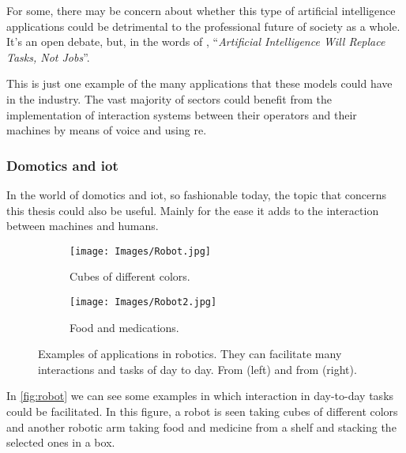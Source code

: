 \begin{remarkBox}
  For some, there may be concern about whether this type of artificial
  intelligence applications could be detrimental to the professional future of
  society as a whole. It's an open debate, but, in the words of
  \citeauthor*{contributor18:artif_intel_will_replac_tasks_not_jobs}
  \cite{contributor18:artif_intel_will_replac_tasks_not_jobs},
  ``\textit{Artificial Intelligence Will Replace Tasks, Not Jobs}''.
\end{remarkBox}

This is just one example of the many applications that these models could have
in the industry. The vast majority of sectors could benefit from the
implementation of interaction systems between their operators and their
machines by means of voice and using \gls{re}.

\subsubsection{Domotics and \acs*{iot}}

In the world of domotics and \gls{iot}, so fashionable today, the topic that
concerns this thesis could also be useful. Mainly for the ease it adds to the
interaction between machines and humans.

\begin{figure}[ht]
  \centering
  \begin{subfigure}[t]{.55\textwidth}
    \centering
    \caption{Cubes of different colors.}
    \texttt{[image: Images/Robot.jpg]}
  \end{subfigure}\hfill
  \begin{subfigure}[t]{.4\textwidth}
    \centering
    \caption{Food and medications.}
    \texttt{[image: Images/Robot2.jpg]}
  \end{subfigure}
  \caption[Examples of applications in robotics]{Examples of applications in
    robotics. They can facilitate many interactions and tasks of day to
    day. From  (left) and from
     (right).}\label{fig:robot}
\end{figure}

In \vref{fig:robot} we can see some examples in which interaction in day-to-day
tasks could be facilitated. In this figure, a robot is seen taking cubes of
different colors and another robotic arm taking food and medicine from a shelf
and stacking the selected ones in a box.

